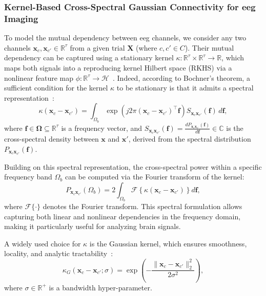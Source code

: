 \subsubsection{Kernel-Based Cross-Spectral Gaussian Connectivity for \gls{eeg} Imaging}\label{sec:kcs}

To model the mutual dependency between \gls{eeg} channels, we consider any two channels \( \mathbf{x}_c, \mathbf{x}_{c'} \in \mathbb{R}^\tau \) from a given trial $\mathbf{X}$ (where $c,c'\in C$). Their mutual dependency can be captured using a stationary kernel \( \kappa : \mathbb{R}^\tau \times \mathbb{R}^\tau \rightarrow \mathbb{R} \), which maps both signals into a reproducing kernel Hilbert space (RKHS) via a nonlinear feature map \( \phi : \mathbb{R}^\tau \rightarrow \mathcal{H} \)~\cite{kanagawa2018gaussianprocesseskernelmethods}. Indeed, according to Bochner’s theorem, a sufficient condition for the kernel $\kappa$ to be stationary is that it admits a spectral representation~\cite{JMLR:v25:22-1434}:
\begin{equation}
\kappa(\mathbf{x}_c - \mathbf{x}_{c'}) = \int_{{\Omega_b}} \exp\left( j2\pi (\mathbf{x}_c - \mathbf{x}_{c'})^\top \mathbf{f} \right) S_{\mathbf{x}_c\mathbf{x}_{c'}}(\mathbf{f})\, d\mathbf{f},
\label{eq:stationary_kernel}
\end{equation}
where \( \mathbf{f} \in \boldsymbol{\Omega} \subseteq \mathbb{R}^\tau \) is a frequency vector, and \( S_{\mathbf{x}_c\mathbf{x}_{c'}}(\mathbf{f}) = \frac{dP_{\mathbf{x}_c\mathbf{x}_{c'}}(\mathbf{f})}{d\mathbf{f}} \in \mathbb{C} \) is the cross-spectral density between \( \mathbf{x} \) and \( \mathbf{x}' \), derived from the spectral distribution \( P_{\mathbf{x}_c\mathbf{x}_{c'}}(\mathbf{f}) \).

Building on this spectral representation, the cross-spectral power within a specific frequency band $\Omega_b$ can be computed via the Fourier transform of the kernel:
\begin{equation}
P_{\mathbf{x}_c\mathbf{x}_{c'}}({\Omega_b}) = 2 \int_{{\Omega_b}} \mathcal{F}\left\{ \kappa(\mathbf{x}_c - \mathbf{x}_{c'}) \right\} d\mathbf{f},
\label{eq:cross_spectral_band}
\end{equation}
where \( \mathcal{F}\{\cdot\} \) denotes the Fourier transform. This spectral formulation allows capturing both linear and nonlinear dependencies in the frequency domain, making it particularly useful for analyzing brain signals.

A widely used choice for \( \kappa \) is the Gaussian kernel, which ensures smoothness, locality, and analytic tractability~\cite{rasmussen2006gaussian}:
\begin{equation}
\kappa_G(\mathbf{x}_c - \mathbf{x}_{c'}; \sigma) = \exp\left( -\frac{\|\mathbf{x}_c - \mathbf{x}_{c'}\|_2^2}{2\sigma^2} \right),
\end{equation}
where \( \sigma \in \mathbb{R}^+ \) is a bandwidth hyper-parameter.

